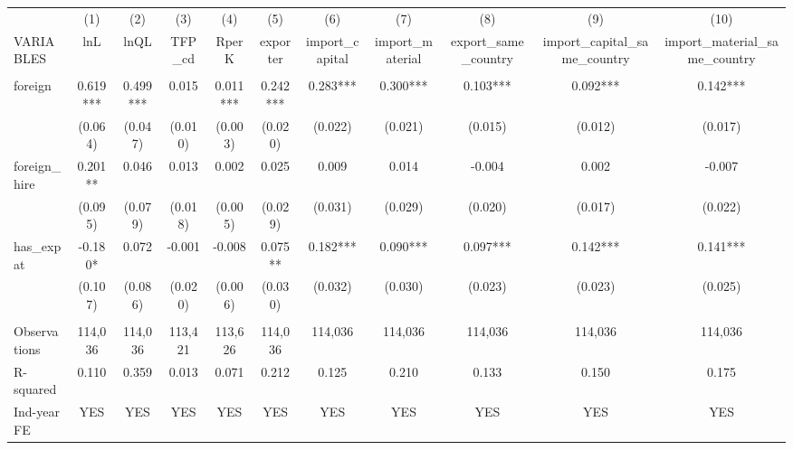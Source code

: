 \begin{tabular}{lcccccccccc} \hline
 & (1) & (2) & (3) & (4) & (5) & (6) & (7) & (8) & (9) & (10) \\
VARIABLES & lnL & lnQL & TFP\_cd & RperK & exporter & import\_capital & import\_material & export\_same\_country & import\_capital\_same\_country & import\_material\_same\_country \\ \hline
 &  &  &  &  &  &  &  &  &  &  \\
foreign & 0.619*** & 0.499*** & 0.015 & 0.011*** & 0.242*** & 0.283*** & 0.300*** & 0.103*** & 0.092*** & 0.142*** \\
 & (0.064) & (0.047) & (0.010) & (0.003) & (0.020) & (0.022) & (0.021) & (0.015) & (0.012) & (0.017) \\
foreign\_hire & 0.201** & 0.046 & 0.013 & 0.002 & 0.025 & 0.009 & 0.014 & -0.004 & 0.002 & -0.007 \\
 & (0.095) & (0.079) & (0.018) & (0.005) & (0.029) & (0.031) & (0.029) & (0.020) & (0.017) & (0.022) \\
has\_expat & -0.180* & 0.072 & -0.001 & -0.008 & 0.075** & 0.182*** & 0.090*** & 0.097*** & 0.142*** & 0.141*** \\
 & (0.107) & (0.086) & (0.020) & (0.006) & (0.030) & (0.032) & (0.030) & (0.023) & (0.023) & (0.025) \\
 &  &  &  &  &  &  &  &  &  &  \\
Observations & 114,036 & 114,036 & 113,421 & 113,626 & 114,036 & 114,036 & 114,036 & 114,036 & 114,036 & 114,036 \\
R-squared & 0.110 & 0.359 & 0.013 & 0.071 & 0.212 & 0.125 & 0.210 & 0.133 & 0.150 & 0.175 \\
 Ind-year FE & YES & YES & YES & YES & YES & YES & YES & YES & YES & YES \\ \hline
\end{tabular}
